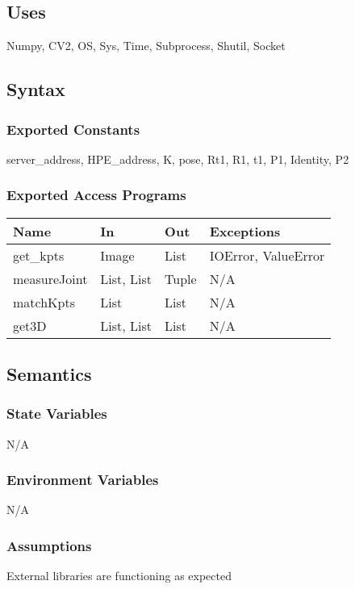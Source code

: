 \documentclass[12pt, titlepage]{article}
\begin{document}
\subsection{Uses}
Numpy, CV2, OS, Sys, Time, Subprocess, Shutil, Socket

\subsection{Syntax}

\subsubsection{Exported Constants}
server\_address, HPE\_address, K, pose, Rt1, R1, t1, P1, Identity, P2

\subsubsection{Exported Access Programs}
\begin{table}[h!]
  \centering
  \begin{tabular}{llll}
    \hline
    \textbf{Name}      & \textbf{In}      & \textbf{Out} & \textbf{Exceptions}       \\
    \hline
    get\_kpts    & Image      & List   & IOError, ValueError \\
    measureJoint & List, List & Tuple  & N/A                 \\
    matchKpts    & List       & List   & N/A                 \\
    get3D        & List, List & List   & N/A                 \\
    \hline
  \end{tabular}
\end{table}

\subsection{Semantics}

\subsubsection{State Variables}
N/A

\subsubsection{Environment Variables}
N/A

\subsubsection{Assumptions}
External libraries are functioning as expected
\end{document}
